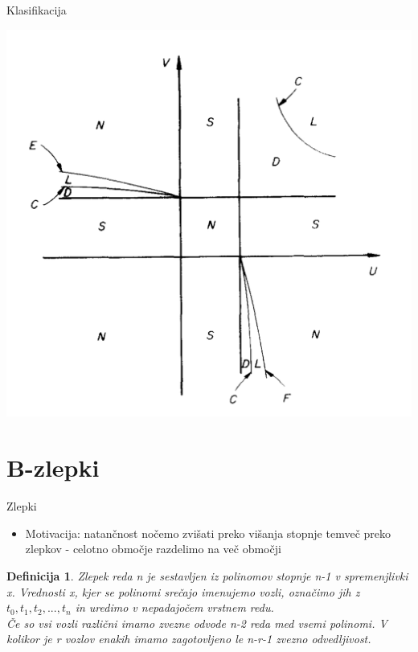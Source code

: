 \documentclass{beamer} %
\newtheorem{definicija}{Definicija}
\begin{document}
\begin{frame}{Klasifikacija}
	\begin{center}
		\includegraphics[width=0.6\columnwidth]{klas.jpg}
	\end{center}
\end{frame}


\section{B-zlepki}
\begin{frame}{Zlepki}
	\begin{itemize}
		\item Motivacija: natančnost nočemo zvišati preko višanja stopnje temveč preko zlepkov - celotno območje razdelimo na več območji
	\end{itemize}
	\begin{definicija}
		Zlepek reda n je sestavljen iz polinomov stopnje n-1 v spremenjlivki x. Vrednosti x, kjer se polinomi srečajo imenujemo vozli, označimo jih z $t_0, t_1, t_2,...,t_n$ in uredimo v nepadajočem vrstnem redu. \\
		Če so vsi vozli različni imamo zvezne odvode n-2 reda med vsemi polinomi. V kolikor je r vozlov enakih imamo zagotovljeno le n-r-1 zvezno odvedljivost. 
	\end{definicija}
	
\end{frame}
\end{document}
